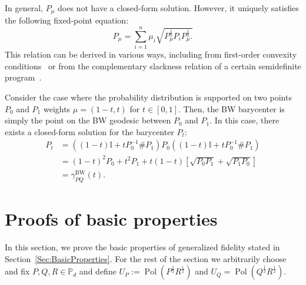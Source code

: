 \documentclass[12pt]{article}
\theoremstyle{definition}
\begin{document}
In general, $P_\mu$ does not have a closed-form solution. However, it uniquely satisfies the following fixed-point equation:
\begin{equation} \label{Eq:BWBaryFPEqn}
    P_\mu = \sum_{i=1}^{n} \mu_i \sqrt{P_\mu^{\frac12} P_i  P_\mu^{\frac12}. }
\end{equation}
This relation can be derived in various ways, including from first-order convexity conditions~\cite{bhatia2019bures} or from the complementary slackness relation of a certain semidefinite program~\cite{afham2022}. 

Consider the case where the probability distribution is supported on two points $P_0$ and $P_1$ weights $\mu = (1-t,t)$ for $t \in [0,1]$. Then, the BW barycenter is simply the point on the BW geodesic between $P_0$ and $P_1$. In this case, there exists a closed-form solution for the barycenter $P_t$:
\begin{equation}
\begin{aligned}        P_t &= \left((1-t) \mathbb I +  t P_0 ^{-1} \# P_1 \right) P_0 \left((1-t) \mathbb I +  t P_0 ^{-1} \# P_1 \right) \\
        &= (1-t)^2 P_0 + t^2 P_1 + t(1-t) \left[\sqrt{P_0 P_1} + \sqrt{P_1 P_0}\right] \\
        &= \gamma^\mathrm{BW}_{PQ}(t).
        \end{aligned}
\end{equation}






\section{Proofs of basic properties} \label{App:BasicProperties}
In this section, we prove the basic properties of generalized fidelity stated in Section~\ref{Sec:BasicProperties}. For the rest of the section we arbitrarily choose and fix $P, Q, R \in \mathbb P_d$ and define $U_P := \operatorname{Pol}\left(P^{\frac12}  R ^{\frac12} \right)$ and $U_Q = \operatorname{Pol}\left(Q ^{\frac12} R ^{\frac12} \right)$. 
\end{document}
